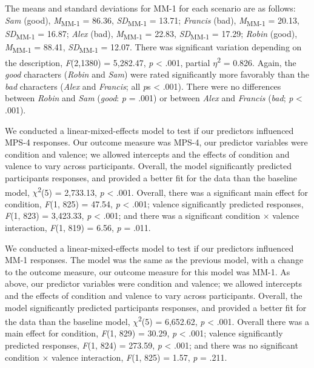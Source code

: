 \documentclass[
  man,floatsintext]{apa6}
\begin{document}
The means and standard deviations for MM-1 for each scenario are as follows:
\emph{Sam} (good),
\emph{M}\textsubscript{MM-1} = 86.36, \emph{SD}\textsubscript{MM-1} = 13.71;
\emph{Francis} (bad),
\emph{M}\textsubscript{MM-1} = 20.13, \emph{SD}\textsubscript{MM-1} = 16.87;
\emph{Alex} (bad),
\emph{M}\textsubscript{MM-1} = 22.83, \emph{SD}\textsubscript{MM-1} = 17.29;
\emph{Robin} (good),
\emph{M}\textsubscript{MM-1} = 88.41, \emph{SD}\textsubscript{MM-1} = 12.07. There was significant variation depending on the description, \emph{F}(2,1380) = 5,282.47, \emph{p} \textless{} .001, partial \(\eta\)\textsuperscript{2} = 0.826. Again, the \emph{good} characters (\emph{Robin} and \emph{Sam}) were rated significantly more favorably than the \emph{bad} characters (\emph{Alex} and \emph{Francis}; all \emph{p}s \textless{} .001). There were no differences between \emph{Robin} and \emph{Sam} (\emph{good}: \emph{p} = .001) or between \emph{Alex} and \emph{Francis} (\emph{bad}; \emph{p} \textless{} .001).

We conducted a linear-mixed-effects model to test if our predictors influenced MPS-4 responses. Our outcome measure was MPS-4, our predictor variables were condition and valence; we allowed intercepts and the effects of condition and valence to vary across participants.
Overall, the model significantly predicted participants responses, and provided a better fit for the data than the baseline model,
\(\chi\)\textsuperscript{2}(5) = 2,733.13, \emph{p} \textless{} .001.
Overall, there was a significant main effect for condition,
\emph{F}(1, 825) = 47.54, \emph{p} \textless{} .001;
valence significantly predicted responses,
\emph{F}(1, 823) = 3,423.33, \emph{p} \textless{} .001;
and there was a significant condition \(\times\) valence interaction,
\emph{F}(1, 819) = 6.56, \emph{p} = .011.

We conducted a linear-mixed-effects model to test if our predictors influenced MM-1 responses. The model was the same as the previous model, with a change to the outcome measure, our outcome measure for this model was MM-1. As above, our predictor variables were condition and valence; we allowed intercepts and the effects of condition and valence to vary across participants.
Overall, the model significantly predicted participants responses, and provided a better fit for the data than the baseline model,
\(\chi\)\textsuperscript{2}(5) = 6,652.62, \emph{p} \textless{} .001.
Overall there was a main effect for condition,
\emph{F}(1, 829) = 30.29, \emph{p} \textless{} .001;
valence significantly predicted responses,
\emph{F}(1, 824) = 273.59, \emph{p} \textless{} .001;
and there was no significant condition \(\times\) valence interaction,
\emph{F}(1, 825) = 1.57, \emph{p} = .211.
\end{document}
